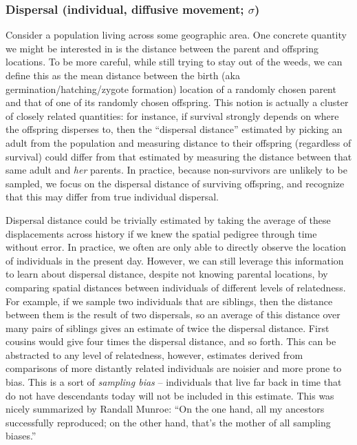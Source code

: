 \documentclass{ar-1col}
\begin{document}
\subsubsection{Dispersal (individual, diffusive movement; $\sigma$)}

Consider a population living across some geographic area.
One concrete quantity we might be interested in is
the distance between the parent and offspring locations.
To be more careful,
while still trying to stay out of the weeds,
we can define this as the mean distance between the
birth (aka germination/hatching/zygote formation)
location of a randomly chosen parent
and that of one of its randomly chosen offspring.
This notion is actually a cluster of closely related quantities:
for instance, if survival strongly depends on where the offspring disperses to,
then the ``dispersal distance'' estimated by picking an adult from the population
and measuring distance to their offspring (regardless of survival)
could differ from that estimated by measuring the distance between that same adult
and \textit{her} parents.
In practice, 
because non-survivors are unlikely to be sampled, 
we focus on the dispersal distance of surviving offspring, 
and recognize that this may differ from true individual dispersal.

Dispersal distance could be trivially estimated by taking
the average of these displacements across history
if we knew the spatial pedigree through time without error.
In practice, we often are only able to directly observe
the location of individuals in the present day.
However, we can still leverage this information to learn about dispersal distance,
despite not knowing parental locations, 
by comparing spatial distances between individuals of different levels of relatedness.
For example, if we sample two individuals that are siblings,
then the distance between them is the result of two dispersals,
so an average of this distance over many pairs of siblings gives an estimate of twice the dispersal distance.
First cousins would give four times the dispersal distance, and so forth.
This can be abstracted to any level of relatedness,
however, estimates derived from comparisons of more distantly related individuals
are noisier and more prone to bias.
This is a sort of \textit{sampling bias} --
individuals that live far back in time that do not have descendants today
will not be included in this estimate.
This was nicely summarized by Randall Munroe: 
``On the one hand, all my ancestors successfully reproduced; 
on the other hand, that's the mother of all sampling biases.''
\end{document}
